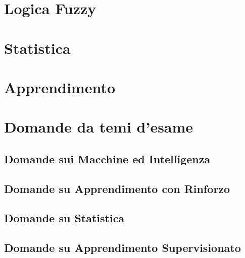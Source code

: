 \providecommand{\main}{.}








{\hypersetup{hidelinks}
  \tableofcontents  %
}

\chapter{Logica Fuzzy}


\chapter{Statistica}


\chapter{Apprendimento}


\appendix
\chapter{Domande da temi d'esame}

\section{Domande sui Macchine ed Intelligenza}

\clearpage

\clearpage
\section{Domande su Apprendimento con Rinforzo}


\section{Domande su Statistica}


\section{Domande su Apprendimento Supervisionato}


